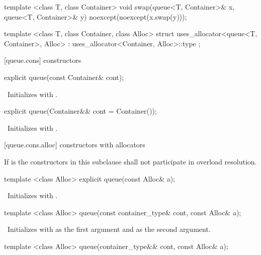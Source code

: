 \begin{codeblock}
{  template <class T, class Container>
    void swap(queue<T, Container>& x, queue<T, Container>& y) noexcept(noexcept(x.swap(y)));

  template <class T, class Container, class Alloc>
    struct uses_allocator<queue<T, Container>, Alloc>
      : uses_allocator<Container, Alloc>::type { };
}
\end{codeblock}

[queue.cons]{ constructors}

\begin{itemdecl}
explicit queue(const Container& cont);
\end{itemdecl}

\begin{itemdescr}
\pnum
\effects\ Initializes  with .
\end{itemdescr}

\begin{itemdecl}
explicit queue(Container&& cont = Container());
\end{itemdecl}

\begin{itemdescr}
\pnum
\effects\ Initializes  with .
\end{itemdescr}

[queue.cons.alloc]{ constructors with allocators}

\pnum
If  is 
the constructors in this subclause shall not participate in overload resolution.

\begin{itemdecl}
template <class Alloc>
  explicit queue(const Alloc& a);
\end{itemdecl}

\begin{itemdescr}
\pnum
\effects\ Initializes  with .
\end{itemdescr}

\begin{itemdecl}
template <class Alloc>
  queue(const container_type& cont, const Alloc& a);
\end{itemdecl}

\begin{itemdescr}
\pnum
\effects\ Initializes  with  as the first argument and 
as the second argument.
\end{itemdescr}

\begin{itemdecl}
template <class Alloc>
  queue(container_type&& cont, const Alloc& a);
\end{itemdecl}

